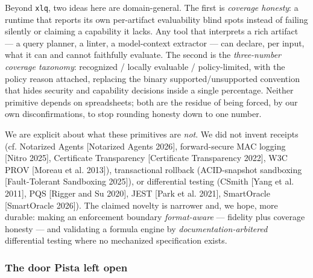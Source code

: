 \documentclass[
]{article}
\begin{document}
Beyond \texttt{xlq}, two ideas here are domain-general. The first is
\emph{coverage honesty}: a runtime that reports its own per-artifact
evaluability blind spots instead of failing silently or claiming a
capability it lacks. Any tool that interprets a rich artifact --- a
query planner, a linter, a model-context extractor --- can declare, per
input, what it can and cannot faithfully evaluate. The second is the
\emph{three-number coverage taxonomy}: recognized / locally evaluable /
policy-limited, with the policy reason attached, replacing the binary
supported/unsupported convention that hides security and capability
decisions inside a single percentage. Neither primitive depends on
spreadsheets; both are the residue of being forced, by our own
disconfirmations, to stop rounding honesty down to one number.

We are explicit about what these primitives are \emph{not}. We did not
invent receipts (cf. Notarized Agents {[}Notarized Agents 2026{]},
forward-secure MAC logging {[}Nitro 2025{]}, Certificate Transparency
{[}Certificate Transparency 2022{]}, W3C PROV {[}Moreau et al. 2013{]}),
transactional rollback (ACID-snapshot sandboxing {[}Fault-Tolerant
Sandboxing 2025{]}), or differential testing (CSmith {[}Yang et al.
2011{]}, PQS {[}Rigger and Su 2020{]}, JEST {[}Park et al. 2021{]},
SmartOracle {[}SmartOracle 2026{]}). The claimed novelty is narrower
and, we hope, more durable: making an enforcement boundary
\emph{format-aware} --- fidelity plus coverage honesty --- and
validating a formula engine by \emph{documentation-arbitered}
differential testing where no mechanized specification exists.

\subsubsection{The door Pista left open}\label{the-door-pista-left-open}
\end{document}
